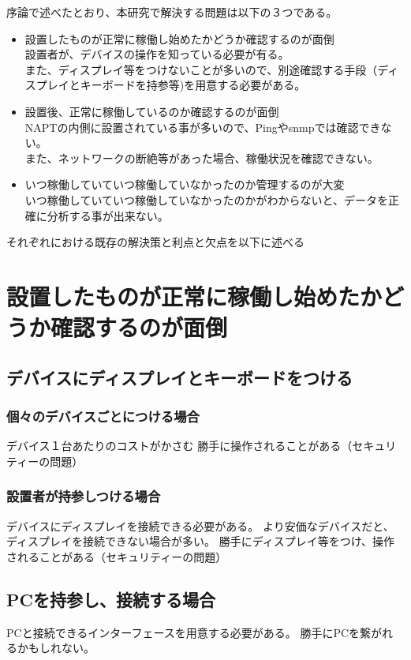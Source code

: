 序論で述べたとおり、本研究で解決する問題は以下の３つである。
\begin{itemize}
	\item 設置したものが正常に稼働し始めたかどうか確認するのが面倒\\
	設置者が、デバイスの操作を知っている必要が有る。\\
	また、ディスプレイ等をつけないことが多いので、別途確認する手段（ディスプレイとキーボードを持参等)を用意する必要がある。
	\item 設置後、正常に稼働しているのか確認するのが面倒\\
	NAPTの内側に設置されている事が多いので、Pingやsnmpでは確認できない。\\
	また、ネットワークの断絶等があった場合、稼働状況を確認できない。
	\item いつ稼働していていつ稼働していなかったのか管理するのが大変\\
	いつ稼働していていつ稼働していなかったのかがわからないと、データを正確に分析する事が出来ない。
\end{itemize}

それぞれにおける既存の解決策と利点と欠点を以下に述べる
\section{設置したものが正常に稼働し始めたかどうか確認するのが面倒}
\subsection{デバイスにディスプレイとキーボードをつける}
\subsubsection{個々のデバイスごとにつける場合}
デバイス１台あたりのコストがかさむ
勝手に操作されることがある（セキュリティーの問題）
\subsubsection{設置者が持参しつける場合}
デバイスにディスプレイを接続できる必要がある。
より安価なデバイスだと、ディスプレイを接続できない場合が多い。
勝手にディスプレイ等をつけ、操作されることがある（セキュリティーの問題）
\subsection{PCを持参し、接続する場合}
PCと接続できるインターフェースを用意する必要がある。
勝手にPCを繋がれるかもしれない。

